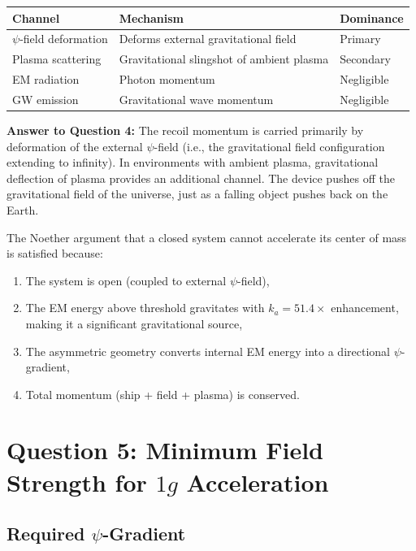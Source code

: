 \documentclass[12pt, letterpaper]{article}
\theoremstyle{definition}
\theoremstyle{remark}
\newcommand{\ka}{k_a}
\begin{document}
\begin{center}
\begin{tabular}{lll}
\hline
Channel & Mechanism & Dominance \\
\hline
$\psi$-field deformation & Deforms external gravitational field & Primary \\
Plasma scattering & Gravitational slingshot of ambient plasma & Secondary \\
EM radiation & Photon momentum & Negligible \\
GW emission & Gravitational wave momentum & Negligible \\
\hline
\end{tabular}
\end{center}

\textbf{Answer to Question 4:} The recoil momentum is carried primarily by
deformation of the external $\psi$-field (i.e., the gravitational field
configuration extending to infinity). In environments with ambient plasma,
gravitational deflection of plasma provides an additional channel. The device
pushes off the gravitational field of the universe, just as a falling object
pushes back on the Earth.

The Noether argument that a closed system cannot accelerate its center of
mass is satisfied because:
\begin{enumerate}
\item The system is open (coupled to external $\psi$-field),
\item The EM energy above threshold gravitates with $\ka = 51.4\times$
enhancement, making it a significant gravitational source,
\item The asymmetric geometry converts internal EM energy into a directional
$\psi$-gradient,
\item Total momentum (ship + field + plasma) is conserved.
\end{enumerate}

\section{Question 5: Minimum Field Strength for $1g$ Acceleration}
\label{sec:Q5}

\subsection{Required $\psi$-Gradient}
\end{document}
